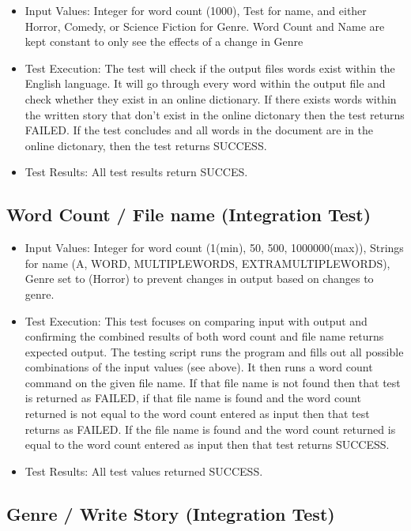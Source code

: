 \documentclass[12pt]{article}
\begin{document}
\begin{itemize}
\item Input Values:  Integer for word count (1000), Test for name, and either
Horror, Comedy, or Science Fiction for Genre. Word Count and Name are kept constant to only see the effects of a change in Genre
\item Test Execution: The test will check if the output files words exist within the English language. It will go through every word within the output file and check whether they exist in an online dictionary. If there exists words within the written story that don't exist in the online dictonary then the test returns FAILED. If the test concludes and all words in the document are in the online dictonary, then the test returns SUCCESS. 
\item Test Results: All test results return SUCCES.
\end{itemize}

\subsection{Word Count / File name (Integration Test)}

\begin{itemize}
\item Input Values: Integer for word count (1(min), 50, 500, 1000000(max)),\newline
Strings for name (A, WORD, MULTIPLEWORDS, EXTRAMULTIPLEWORDS),\newline
Genre set to (Horror) to prevent changes in output based on changes to genre.
\item Test Execution: This test focuses on comparing input with output and confirming the combined results of both word count and file name returns expected output. The testing script runs the program and fills out all possible combinations of the input values (see above). It then runs a word count command on the given file name. If that file name is not found then that test is returned as FAILED, if that file name is found and the word count returned is not equal to the word count entered as input then that test returns as FAILED. If the file name is found and the word count returned is equal to the word count entered as input then that test returns SUCCESS.
\item Test Results: All test values returned SUCCESS.
\end{itemize}

\subsection{Genre / Write Story (Integration Test)}
\end{document}
